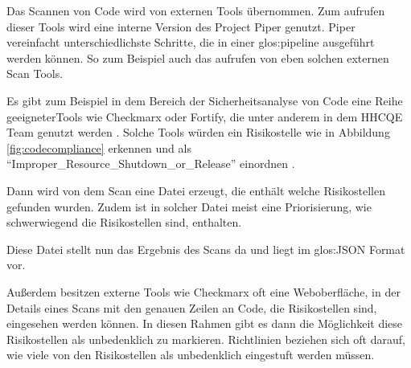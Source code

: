 \documentclass[../main.tex]{subfiles}
\begin{document}
Das Scannen von Code wird von externen Tools übernommen.
Zum aufrufen dieser Tools wird eine interne Version des Project Piper genutzt. Piper vereinfacht unterschiedlichste Schritte, die in einer \gls{glos:pipeline} ausgeführt werden können.
So zum Beispiel auch das aufrufen von eben solchen externen Scan Tools. 

Es gibt zum Beispiel in dem Bereich der Sicherheitsanalyse von Code eine Reihe geeigneterTools wie Checkmarx oder Fortify, die unter anderem in dem \gls{HHCQE} Team genutzt werden \cite{SASTTools}.
Solche Tools würden ein Risikostelle wie in Abbildung \ref{fig:codecompliance} erkennen und als \enquote{Improper\_Resource\_Shutdown\_or\_Release} einordnen \cite{SecurityVulnerabilities}.


Dann wird von dem Scan eine Datei erzeugt, die enthält welche Risikostellen gefunden wurden.
Zudem ist in solcher Datei meist eine Priorisierung, wie schwerwiegend die Risikostellen sind, enthalten.

Diese Datei stellt nun das Ergebnis des Scans da und liegt im \gls{glos:JSON} Format vor.

Außerdem besitzen externe Tools wie Checkmarx oft eine Weboberfläche, in der Details eines Scans mit den genauen Zeilen an Code, die Risikostellen sind, eingesehen werden können.
In diesen Rahmen gibt es dann die Möglichkeit diese Risikostellen als unbedenklich zu markieren.
Richtlinien beziehen sich oft darauf, wie viele von den Risikostellen als unbedenklich eingestuft werden müssen.
\end{document}
